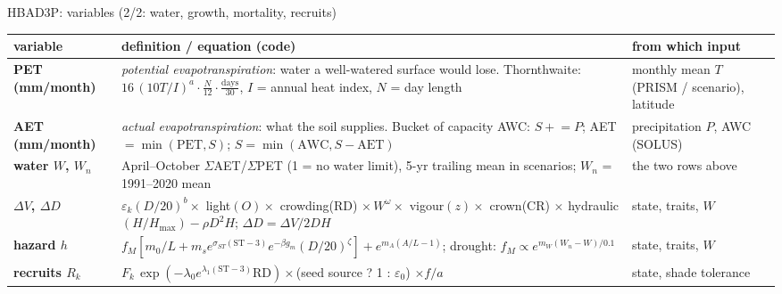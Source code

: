 \begin{frame}{HBAD3P: variables (2/2: water, growth, mortality, recruits)}
\scriptsize
\renewcommand{\arraystretch}{1.07}
\begin{tabularx}{\textwidth}{@{}>{\bfseries}p{2.3cm}X>{\raggedright\arraybackslash}p{3.9cm}@{}}
\toprule
variable & definition / equation (code) & from which input \\
\midrule
PET (mm/month) & \emph{potential evapotranspiration}: water a well-watered surface would lose. Thornthwaite: $16\,(10T/I)^a\cdot\frac{N}{12}\cdot\frac{\text{days}}{30}$, $I$ = annual heat index, $N$ = day length & monthly mean $T$ (PRISM / scenario), latitude \\
AET (mm/month) & \emph{actual evapotranspiration}: what the soil supplies. Bucket of capacity AWC: $S \mathrel{+}= P$; AET $=\min(\text{PET}, S)$; $S=\min(\text{AWC}, S-\text{AET})$ & precipitation $P$, AWC (SOLUS) \\
water $W$, $W_n$ & April–October $\Sigma$AET/$\Sigma$PET (1 = no water limit), 5-yr trailing mean in scenarios; $W_n$ = 1991–2020 mean & the two rows above \\
$\Delta V$, $\Delta D$ & $\varepsilon_k(D/20)^b\times$ light$(O)\times$ crowding(RD) $\times\,W^{\omega}\times$ vigour$(z)\times$ crown(CR) $\times$ hydraulic$(H/H_{\max})-\rho D^2H$; $\Delta D=\Delta V/2DH$ & state, traits, $W$ \\
hazard $h$ & $f_M[m_0/L+m_s e^{\sigma_{ST}(\text{ST}-3)}e^{-\beta g_m}(D/20)^{\zeta}]+e^{m_A(A/L-1)}$; drought: $f_M\propto e^{m_W(W_n-W)/0.1}$ & state, traits, $W$ \\
recruits $R_k$ & $F_k\,\exp(-\lambda_0e^{\lambda_1(\text{ST}-3)}\text{RD})\times$(seed source ? 1 : $\varepsilon_0$) $\times f/a$ & state, shade tolerance \\
\bottomrule
\end{tabularx}
\end{frame}
